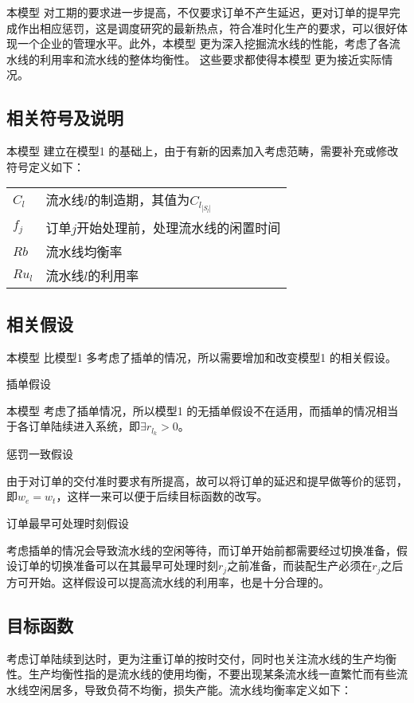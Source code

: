 本模型 对工期的要求进一步提高，不仅要求订单不产生延迟，更对订单的提早完成作出相应惩罚，这是调度研究的最新热点，符合准时化生产的要求，可以很好体现一个企业的管理水平。此外，本模型 更为深入挖掘流水线的性能，考虑了各流水线的利用率和流水线的整体均衡性。
这些要求都使得本模型 更为接近实际情况。
\subsection{相关符号及说明}
本模型 建立在模型1 的基础上，由于有新的因素加入考虑范畴，需要补充或修改符号定义如下：

\begin{supertabular}{ll}
$C_l$ & 流水线$l$的制造期，其值为$C_{l_{|S_l|}}$ \\
$f_j$ & 订单$j$开始处理前，处理流水线的闲置时间\\
$Rb$ & 流水线均衡率 \\
$Ru_l$ & 流水线$l$的利用率\\ 
\end{supertabular}

\subsection{相关假设}
本模型 比模型1 多考虑了插单的情况，所以需要增加和改变模型1 的相关假设。
\begin{compactenum}
\item 插单假设

本模型 考虑了插单情况，所以模型1 的无插单假设不在适用，而插单的情况相当于各订单陆续进入系统，即$\exists r_{l_k} >0$。
\item 惩罚一致假设

由于对订单的交付准时要求有所提高，故可以将订单的延迟和提早做等价的惩罚，即$w_e = w_t$，这样一来可以便于后续目标函数的改写。
\item 订单最早可处理时刻假设
\end{compactenum}

考虑插单的情况会导致流水线的空闲等待，而订单开始前都需要经过切换准备，假设订单的切换准备可以在其最早可处理时刻$r_j$之前准备，而装配生产必须在$r_j$之后方可开始。这样假设可以提高流水线的利用率，也是十分合理的。
\subsection{目标函数}
考虑订单陆续到达时，更为注重订单的按时交付，同时也关注流水线的生产均衡性。生产均衡性指的是流水线的使用均衡，不要出现某条流水线一直繁忙而有些流水线空闲居多，导致负荷不均衡，损失产能。流水线均衡率定义如下：

